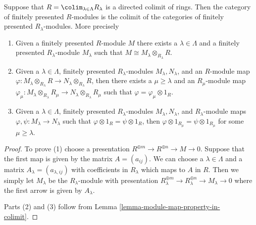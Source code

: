 \begin{lemma}
\label{lemma-colimit-category-fp-modules}
Suppose that $R = \colim_{\lambda \in \Lambda} R_\lambda$ is a directed colimit
of rings. Then the category of finitely presented $R$-modules is
the colimit of the categories of finitely presented $R_\lambda$-modules.
More precisely
\begin{enumerate}
\item Given a finitely presented $R$-module $M$ there exists a
$\lambda \in \Lambda$ and a finitely presented $R_\lambda$-module
$M_\lambda$ such that $M \cong M_\lambda \otimes_{R_\lambda} R$.
\item Given a $\lambda \in \Lambda$, finitely presented
$R_\lambda$-modules $M_\lambda, N_\lambda$, and an $R$-module map
$\varphi : M_\lambda \otimes_{R_\lambda} R \to N_\lambda \otimes_{R_\lambda} R$,
then there exists a $\mu \geq \lambda$ and an $R_\mu$-module map
$\varphi_\mu : M_\lambda \otimes_{R_\lambda} R_\mu \to
N_\lambda \otimes_{R_\lambda} R_\mu$
such that $\varphi = \varphi_\mu \otimes 1_R$.
\item Given a $\lambda \in \Lambda$, finitely presented
$R_\lambda$-modules $M_\lambda, N_\lambda$, and $R_\lambda$-module maps
$\varphi, \psi : M_\lambda \to N_\lambda$
such that $\varphi \otimes 1_R = \psi \otimes 1_R$, then
$\varphi \otimes 1_{R_\mu} = \psi \otimes 1_{R_\mu}$ for some
$\mu \geq \lambda$.
\end{enumerate}
\end{lemma}

\begin{proof}
To prove (1) choose a presentation
$R^{\oplus m} \to R^{\oplus n} \to M \to 0$.
Suppose that the first map is given by the matrix $A = (a_{ij})$.
We can choose a $\lambda \in \Lambda$ and a matrix
$A_\lambda = (a_{\lambda, ij})$ with coefficients in $R_\lambda$
which maps to $A$ in $R$.
Then we simply let $M_\lambda$ be the $R_\lambda$-module with presentation
$R_\lambda^{\oplus m} \to R_\lambda^{\oplus n} \to M_\lambda \to 0$
where the first arrow is given by $A_\lambda$.

\medskip\noindent
Parts (2) and (3) follow from
Lemma \ref{lemma-module-map-property-in-colimit}.
\end{proof}

